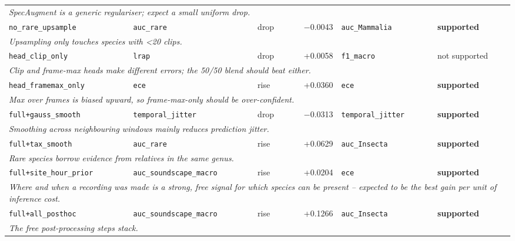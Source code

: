 \begin{longtable}{p{3.1cm}p{3.3cm}p{1.4cm}rp{2.9cm}p{1.8cm}}
\multicolumn{6}{p{15cm}}{\emph{SpecAugment is a generic regulariser; expect a small uniform drop.}} \\[2pt]
\texttt{no\_rare\_upsample} & \texttt{auc\_rare} & drop & $-$0.0043 & \texttt{auc\_Mammalia} & \textbf{supported} \\
\multicolumn{6}{p{15cm}}{\emph{Upsampling only touches species with <20 clips.}} \\[2pt]
\texttt{head\_clip\_only} & \texttt{lrap} & drop & +0.0058 & \texttt{f1\_macro} & not supported \\
\multicolumn{6}{p{15cm}}{\emph{Clip and frame-max heads make different errors; the 50/50 blend should beat either.}} \\[2pt]
\texttt{head\_framemax\_only} & \texttt{ece} & rise & +0.0360 & \texttt{ece} & \textbf{supported} \\
\multicolumn{6}{p{15cm}}{\emph{Max over frames is biased upward, so frame-max-only should be over-confident.}} \\[2pt]
\texttt{full+gauss\_smooth} & \texttt{temporal\_jitter} & drop & $-$0.0313 & \texttt{temporal\_jitter} & \textbf{supported} \\
\multicolumn{6}{p{15cm}}{\emph{Smoothing across neighbouring windows mainly reduces prediction jitter.}} \\[2pt]
\texttt{full+tax\_smooth} & \texttt{auc\_rare} & rise & +0.0629 & \texttt{auc\_Insecta} & \textbf{supported} \\
\multicolumn{6}{p{15cm}}{\emph{Rare species borrow evidence from relatives in the same genus.}} \\[2pt]
\texttt{full+site\_hour\_prior} & \texttt{auc\_soundscape\_macro} & rise & +0.0204 & \texttt{ece} & \textbf{supported} \\
\multicolumn{6}{p{15cm}}{\emph{Where and when a recording was made is a strong, free signal for which species can be present -- expected to be the best gain per unit of inference cost.}} \\[2pt]
\texttt{full+all\_posthoc} & \texttt{auc\_soundscape\_macro} & rise & +0.1266 & \texttt{auc\_Insecta} & \textbf{supported} \\
\multicolumn{6}{p{15cm}}{\emph{The free post-processing steps stack.}} \\[2pt]
\end{longtable}
\endgroup
